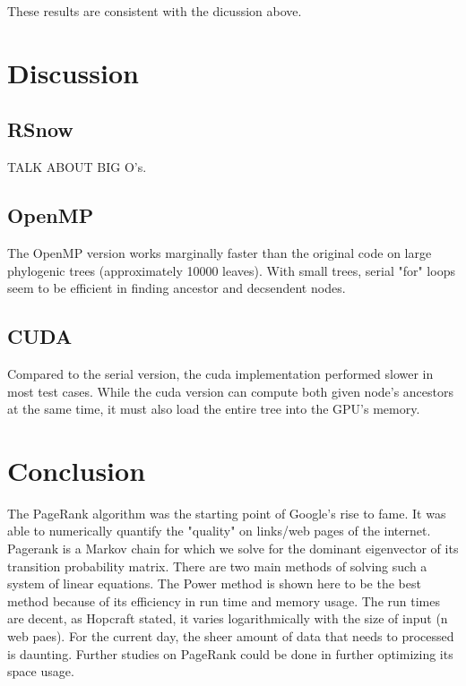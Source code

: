 \documentclass[11pt,letterpaper]{article}
\begin{document}
These results are consistent with the dicussion above. 

\section{Discussion}

\subsection{RSnow}
TALK ABOUT BIG O's.\\

\subsection{OpenMP}
The OpenMP version works marginally faster than the original code on large phylogenic trees (approximately 10000 leaves). With small trees, serial "for" loops seem to be efficient in finding ancestor and decsendent nodes. \\

\subsection{CUDA}

Compared to the serial version, the cuda implementation performed slower in most test cases. While the cuda version can compute both given node’s ancestors at the same time, it must also load the entire tree into the GPU’s memory.\\


\section{Conclusion}

The PageRank algorithm was the starting point of Google's rise to fame. It was able to numerically quantify the "quality" on links/web pages of the internet. Pagerank is a Markov chain for which we solve for the dominant eigenvector of its transition probability matrix. There are two main methods of solving such a system of linear equations. The Power method is shown here to be the best method because of its efficiency in run time and memory usage. The run times are decent, as Hopcraft stated, it varies logarithmically with the size of input (n web paes). For the current day, the sheer amount of data that needs to processed is daunting. Further studies on PageRank could be done in further optimizing its space usage. 
\end{document}
